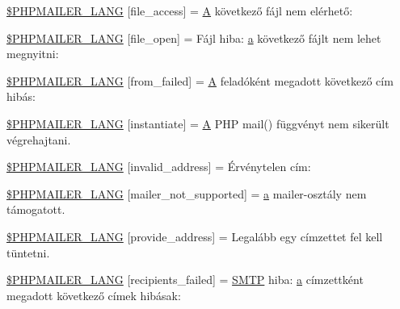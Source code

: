 \begin{DoxyCompactItemize}
\item 
\hyperlink{phpmailer_8lang-hu_8php_a7e83349023b856ef9e5c46e30ae6d51e}{\$\+P\+H\+P\+M\+A\+I\+L\+E\+R\+\_\+\+L\+A\+NG} \mbox{[}\textquotesingle{}file\+\_\+access\textquotesingle{}\mbox{]} = \textquotesingle{}\hyperlink{_chart_8min_8js_a9757042cb6157b0f84e78a5ff4aa6f93}{A} következő fájl nem elérhető\+: \textquotesingle{}
\item 
\hyperlink{phpmailer_8lang-hu_8php_a28d1a6517bf4c942a0ddd506188ad2e0}{\$\+P\+H\+P\+M\+A\+I\+L\+E\+R\+\_\+\+L\+A\+NG} \mbox{[}\textquotesingle{}file\+\_\+open\textquotesingle{}\mbox{]} = \textquotesingle{}Fájl hiba\+: \hyperlink{_chart_8min_8js_aef3b685c08bc6c76c8e729bd0e93901d}{a} következő fájlt nem lehet megnyitni\+: \textquotesingle{}
\item 
\hyperlink{phpmailer_8lang-hu_8php_adf832ae12155a09be077c6d5e4fd7e22}{\$\+P\+H\+P\+M\+A\+I\+L\+E\+R\+\_\+\+L\+A\+NG} \mbox{[}\textquotesingle{}from\+\_\+failed\textquotesingle{}\mbox{]} = \textquotesingle{}\hyperlink{_chart_8min_8js_a9757042cb6157b0f84e78a5ff4aa6f93}{A} feladóként megadott következő cím hibás\+: \textquotesingle{}
\item 
\hyperlink{phpmailer_8lang-hu_8php_ad58dde16780f4770ccf4dd282ea1f5ad}{\$\+P\+H\+P\+M\+A\+I\+L\+E\+R\+\_\+\+L\+A\+NG} \mbox{[}\textquotesingle{}instantiate\textquotesingle{}\mbox{]} = \textquotesingle{}\hyperlink{_chart_8min_8js_a9757042cb6157b0f84e78a5ff4aa6f93}{A} P\+HP mail() függvényt nem sikerült végrehajtani.\textquotesingle{}
\item 
\hyperlink{phpmailer_8lang-hu_8php_a42d61bcea4c79599ecb44fd062f54d47}{\$\+P\+H\+P\+M\+A\+I\+L\+E\+R\+\_\+\+L\+A\+NG} \mbox{[}\textquotesingle{}invalid\+\_\+address\textquotesingle{}\mbox{]} = \textquotesingle{}Érvénytelen cím\+: \textquotesingle{}
\item 
\hyperlink{phpmailer_8lang-hu_8php_aa2ebcb8833ee83a7ad67401c4bb3a6ad}{\$\+P\+H\+P\+M\+A\+I\+L\+E\+R\+\_\+\+L\+A\+NG} \mbox{[}\textquotesingle{}mailer\+\_\+not\+\_\+supported\textquotesingle{}\mbox{]} = \textquotesingle{} \hyperlink{_chart_8min_8js_aef3b685c08bc6c76c8e729bd0e93901d}{a} mailer-\/osztály nem támogatott.\textquotesingle{}
\item 
\hyperlink{phpmailer_8lang-hu_8php_a8b97897c2406b7392b056f375feeefbb}{\$\+P\+H\+P\+M\+A\+I\+L\+E\+R\+\_\+\+L\+A\+NG} \mbox{[}\textquotesingle{}provide\+\_\+address\textquotesingle{}\mbox{]} = \textquotesingle{}Legalább egy címzettet fel kell tüntetni.\textquotesingle{}
\item 
\hyperlink{phpmailer_8lang-hu_8php_a7589d30bb9b368327c2df015f3e6bcba}{\$\+P\+H\+P\+M\+A\+I\+L\+E\+R\+\_\+\+L\+A\+NG} \mbox{[}\textquotesingle{}recipients\+\_\+failed\textquotesingle{}\mbox{]} = \textquotesingle{}\hyperlink{class_s_m_t_p}{S\+M\+TP} hiba\+: \hyperlink{_chart_8min_8js_aef3b685c08bc6c76c8e729bd0e93901d}{a} címzettként megadott következő címek hibásak\+: \textquotesingle{}

\end{DoxyCompactItemize}
